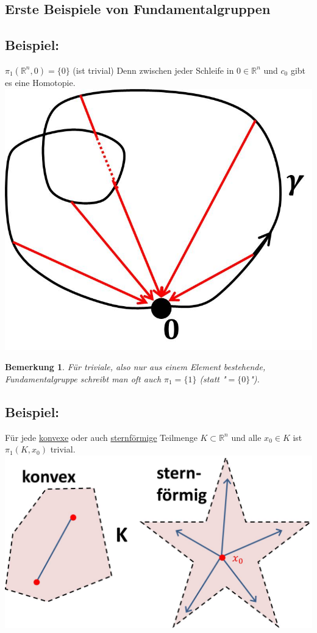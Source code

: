 \documentclass[a4paper,11pt,notitlepage]{report}
\newtheorem{remark}{Bemerkung}[chapter]
\newcommand{\R}{{\ensuremath{\mathbb{R}}}}
\newenvironment{bsp}[1]
{
\setlength{\fboxsep}{10pt}
\subsection*{Beispiel: #1}
\begin{upshape}
}
{
\end{upshape}
}
\begin{document}
\subsection{Erste Beispiele von Fundamentalgruppen}
\begin{bsp}{}
	$\pi_1(\R^n, 0) = \{0\}$ (ist trivial)
	\newline
	Denn zwischen jeder Schleife in $0 \in \R^n$ und $c_0$ gibt es eine Homotopie.
	\newline \includegraphics[scale=0.4]{images/Fundamentalgruppe_Rn.jpg}
\end{bsp}

\begin{remark}{}
	Für triviale, also nur aus einem Element bestehende, Fundamentalgruppe schreibt man oft auch $\pi_1 = \{1\}$ (statt "$=\{0\}$").
\end{remark}

\begin{bsp}{}
	Für jede \underline{konvexe} oder auch \underline{sternförmige} Teilmenge $K \subset \R^n$ und alle $x_0 \in K$ ist $\pi_1(K,x_0)$ trivial. \newline \includegraphics[scale=0.4]{images/konvex_sternfoermig.jpg}
\end{bsp}
\end{document}
